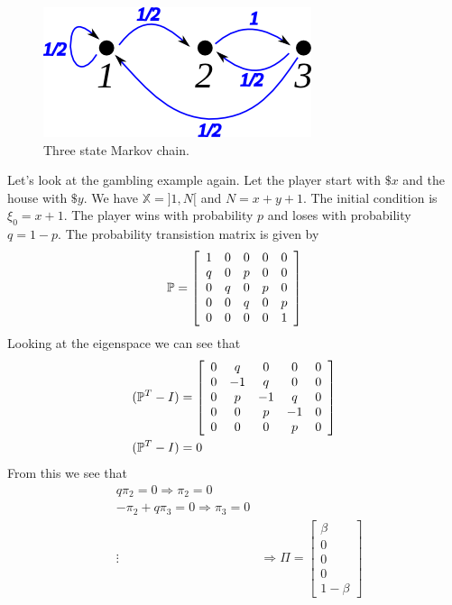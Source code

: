 \begin{figure}[ht!]
	\centering
	\includegraphics[width=.4\textwidth]{images/10mc3b}
	\caption{Three state Markov chain.}
	\label{fig:10mc3b}
\end{figure}

\begin{example}
\label{ex:gambling}
Let's look at the gambling example again. Let the player start with $\$x$ and the house with $\$y$. We have $\mathbb{X}=]1,N[$ and $N=x+y+1$. The initial condition is $\xi_0=x+1$. The player wins with probability $p$ and loses with probability $q=1-p$. The probability transistion matrix is given by
$$\mathbb{P} = \left[\begin{array}{c c c c c} 1 & 0 & 0 & 0 & 0 \\ q & 0 & p & 0 & 0 \\ 0 & q & 0 & p & 0 \\ 0 & 0 & q & 0 & p \\ 0 & 0 & 0 & 0 & 1 \end{array}\right]$$
Looking at the eigenspace we can see that
\begin{align*}
&(\mathbb{P}^T-I) = \left[\begin{array}{c c c c c} 0 & q & 0 & 0 & 0 \\ 0 & -1 & q & 0 & 0 \\ 0 & p & -1 & q & 0 \\ 0 & 0 & p & -1 & 0 \\ 0 & 0 & 0 & p & 0 \end{array}\right] \\
&(\mathbb{P}^T-I) = 0
\end{align*}
From this we see that
\begin{align*}
&q\pi_2 = 0 \Rightarrow \pi_2=0 \\
&-\pi_2+q\pi_3 = 0 \Rightarrow \pi_3=0 \\
&\vdots
&\Rightarrow \Pi = \left[\begin{array}{c} \beta \\ 0 \\ 0 \\ 0 \\ 1-\beta \end{array}\right]
\end{align*}

\end{example}
